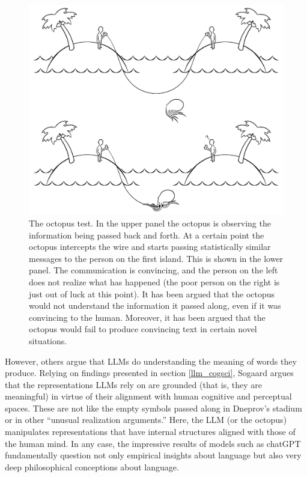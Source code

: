 \begin{figure}[h]
\centering
\includegraphics[scale=.20]{./images/octopusTest.png}
\caption[Soraya Boza.]{The octopus test. In the upper panel the octopus is observing the information being passed back and forth.  At a certain point the octopus intercepts the wire and starts passing statistically similar messages to the person on the first island.  This is shown in the lower panel. The communication is convincing, and the person on the left does not realize what has happened (the poor person on the right is just out of luck at this point). It has been argued that the octopus would not understand the information it passed along, even if it was convincing to the human. Moreover, it has been argued that the octopus would fail to produce convincing text in certain novel situations.}
\label{octopusTest}
\end{figure}

However, others argue that LLMs do understanding the meaning of words they produce. Relying on findings presented in section \ref{llm_cogsci}, Sogaard \cite{sogaard2023grounding} argues that the representations LLMs rely on are grounded (that is, they are meaningful) in virtue of their alignment with human cognitive and perceptual spaces. These are not like the empty symbols passed along in Dneprov's stadium or in other ``unusual realization arguments.'' Here, the LLM (or the octopus) manipulates representations that have internal structures aligned with those of the human mind. In any case, the impressive results of models such as chatGPT fundamentally question not only empirical insights about language but also very deep philosophical conceptions about language.


